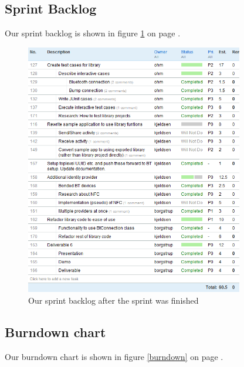 \documentclass[a4paper,11pt]{article}
\begin{document}
\subsection{Sprint Backlog}
Our sprint backlog is shown in figure \ref{sprintbacklog} on page \pageref{sprintbacklog}.

 \begin{figure}[ht!]
	\begin{center}
 	\includegraphics[width=0.85\textwidth]{sprint_backlog.png}		
 	\end{center}
 	\caption{Our sprint backlog after the sprint was finished}
 	\label{sprintbacklog}
 \end{figure}

\subsection{Burndown chart}

Our burndown chart is shown in figure \ref{burndown} on page \pageref{burndown}.
\end{document}
